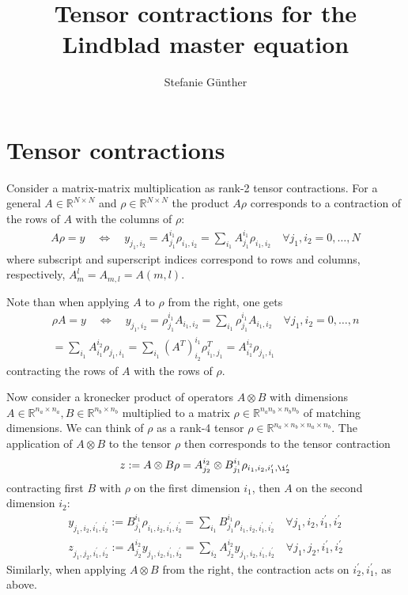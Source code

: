 \documentclass[letterpaper]{article}
\title{Tensor contractions for the Lindblad master equation}
\author{Stefanie G{\"u}nther}
\newcommand{\R}{\mathds{R}}
\begin{document}
\maketitle

\section{Tensor contractions}
Consider a matrix-matrix multiplication as rank-2 tensor contractions. For a general $A\in \R^{N\times N}$ and $\rho\in \R^{N\times N}$ the product $A\rho$ corresponds to a contraction of the rows of $A$ with the columns of $\rho$:
\begin{align}
    A \rho = y \quad \Leftrightarrow \quad y_{j_1,i_2} = A_{j_1}^{i_1} \rho_{i_1,i_2} = \sum_{i_1} A_{j_1}^{i_1} \rho_{i_1,i_2} \quad \forall j_1,i_2 = 0,\dots, N
\end{align}
where subscript and superscript indices correspond to rows and columns, respectively, $A_m^l = A_{m,l} = A(m,l)$. 

Note than when applying $A$ to $\rho$ from the right, one gets 
\begin{align}
    \rho A = y \quad \Leftrightarrow \quad y_{j_1,i_2} = \rho_{j_1}^{i_1} A_{i_1,i_2} = \sum_{i_1} \rho_{j_1}^{i_1} A_{i_1,i_2} \quad \forall j_1,i_2 = 0,\dots, n \\
   = \sum_{i_1} A_{i_1}^{i_2} \rho_{j_1,i_1} = \sum_{i_1} (A^T)_{i_2}^{i_1} \rho^T_{i_1,j_1} = A_{i_1}^{i_2} \rho_{j_1,i_1}
\end{align}
contracting the rows of $A$ with the rows of $\rho$. 

Now consider a kronecker product of operators $A\otimes B$ with dimensions $A\in\R^{n_a\times n_a}, B\in\R^{n_b\times n_b}$ multiplied to a matrix $\rho \in \R^{n_an_b\times n_bn_b}$ of matching dimensions. We can think of $\rho$ as a rank-4 tensor $\rho\in\R^{n_a\times n_b \times n_a \times n_b}$. The application of $A\otimes B$ to the tensor $\rho$ then corresponds to the tensor contraction 
\begin{align}
    z := A\otimes B \rho = A_{j_2}^{i_2}\otimes B_{j_1}^{i_1} \rho_{i_1, i_2, i_1^{\prime}, \i_2^{\prime}}
\end{align}
contracting first $B$ with $\rho$ on the first dimension $i_1$, then $A$ on the second dimension $i_2$:
\begin{align}
    y_{j_1, i_2, i_1^{\prime}, i_2^{\prime}} := B_{j_1}^{i_1} \rho_{i_1, i_2, i_1^{\prime}, i_2^{\prime}} = \sum_{i_1} B_{j_1}^{i_1} \rho_{i_1, i_2, i_1^{\prime}, i_2^{\prime}} \quad \forall j_1,i_2,i_1^\prime, i_2^\prime\\
    z_{j_1, j_2, i_1^{\prime}, i_2^{\prime}} := A_{j_2}^{i_2} y_{j_1, i_2, i_1^{\prime}, i_2^{\prime}} = \sum_{i_2} A_{j_2}^{i_2} y_{j_1, i_2, i_1^{\prime}, i_2^{\prime}} \quad \forall j_1,j_2,i_1^\prime, i_2^\prime
\end{align}
Similarly, when applying $A\otimes B$ from the right, the contraction acts on $i_2^\prime, i_1^\prime$, as above. 
\end{document}
